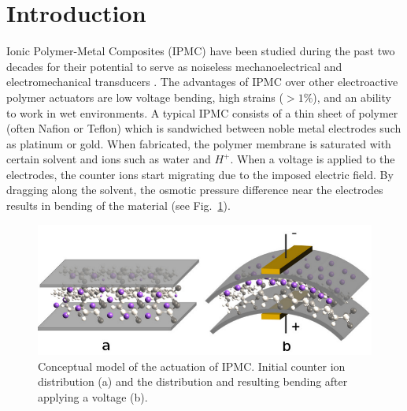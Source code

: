 \section{Introduction}

Ionic Polymer-Metal Composites (IPMC) have been studied during the past two 
decades for their potential to serve as noiseless mechanoelectrical and electromechanical 
transducers \cite{basu1997membrane,shahinpoor2001smartmat,
nasser2002applied,newbury2003intelligent, wallmersperger2007appliedphysics,
pugal2008appliedphysics,pugal2010polymer}.
The advantages of IPMC over other electroactive polymer actuators
are low voltage bending, high strains ($>1\%$), and an ability to work
in wet environments. A typical IPMC consists of a thin sheet of polymer
(often Nafion or Teflon) which is sandwiched between noble
metal electrodes such as platinum or gold. When fabricated, the polymer 
membrane is saturated with certain solvent and ions such as water and $H^+$.
When a voltage is applied to the electrodes, the counter ions start
migrating due to the imposed electric field. By dragging along the solvent,
the osmotic pressure difference near the electrodes
results in bending of the material (see Fig.~\ref{fig:conceptual}).
\begin{figure}[!ht]
  \begin{centering}
  \includegraphics[scale=0.7]{IPMC_bending}
  \caption{\label{fig:conceptual}Conceptual model of the actuation
 	of IPMC. Initial counter ion distribution (a) and
	the distribution and resulting bending after applying a voltage (b).}
  \end{centering}
\end{figure}

